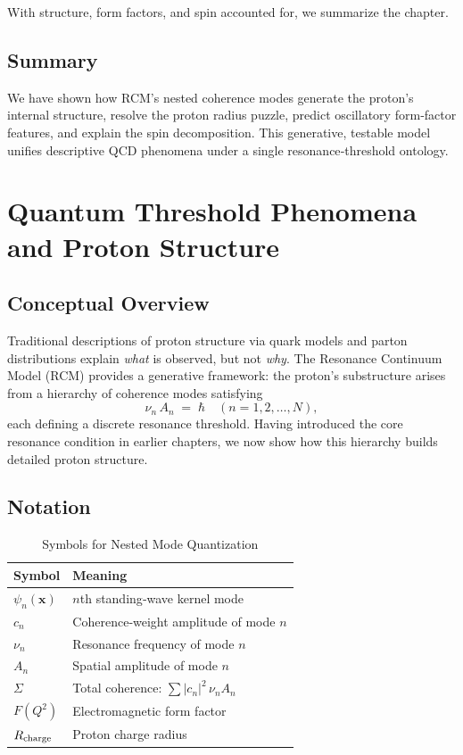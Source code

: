 \bigskip
\noindent With structure, form factors, and spin accounted for, we summarize the chapter.

\subsection{Summary}
We have shown how RCM’s nested coherence modes generate the proton’s internal structure, resolve the proton radius puzzle, predict oscillatory form‐factor features, and explain the spin decomposition.  This generative, testable model unifies descriptive QCD phenomena under a single resonance‐threshold ontology.

\section{Quantum Threshold Phenomena and Proton Structure}

\subsection{Conceptual Overview}
Traditional descriptions of proton structure via quark models and parton distributions explain {\it what} is observed, but not {\it why}.  The Resonance Continuum Model (RCM) provides a generative framework: the proton’s substructure arises from a hierarchy of coherence modes satisfying
\begin{equation}\label{eq:mode_coherence}
\nu_n\,A_n \;=\;\hbar
\quad(n=1,2,\dots,N),
\end{equation}
each defining a discrete resonance threshold.  Having introduced the core resonance condition in earlier chapters, we now show how this hierarchy builds detailed proton structure.

\subsection{Notation}
\begin{table}[ht]
  \centering
  \caption{Symbols for Nested Mode Quantization}
  \label{tab:mode_notation}
  \begin{tabular}{@{}ll@{}}
    \toprule
    Symbol & Meaning \\
    \midrule
    \(\psi_n(\mathbf x)\) & \(n\)th standing‐wave kernel mode \\
    \(c_n\)               & Coherence‐weight amplitude of mode \(n\) \\
    \(\nu_n\)             & Resonance frequency of mode \(n\) \\
    \(A_n\)               & Spatial amplitude of mode \(n\) \\
    \(\Sigma\)            & Total coherence: \(\sum |c_n|^2\,\nu_n A_n\) \\
    \(F(Q^2)\)            & Electromagnetic form factor \\
    \(R_{\rm charge}\)    & Proton charge radius \\
    \bottomrule
  \end{tabular}
\end{table}

